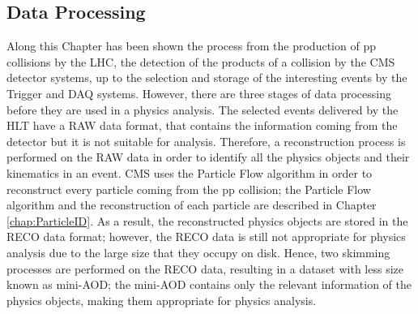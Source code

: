 \subsection{Data Processing}
\noindent Along this Chapter has been shown the process from the production of pp 
collisions by the LHC, the detection of the products of a collision by 
the CMS detector systems, up to the selection and storage of the interesting 
events by the Trigger and DAQ systems. However, there are three stages of data 
processing before they are used in a physics analysis. The selected events delivered 
by the HLT have a RAW data format, that contains the information coming from the 
detector but it is not suitable for analysis. Therefore, a reconstruction process is 
performed on the RAW data in order to identify all the physics objects and their 
kinematics in an event. CMS uses the Particle Flow algorithm in order to reconstruct 
every particle coming from the pp collision; the Particle Flow algorithm and the 
reconstruction of each particle are described in Chapter \ref{chap:ParticleID}. As a result, 
the reconstructed physics objects are stored in the RECO data format; however, the 
RECO data is still not appropriate for physics analysis due to the large size that they 
occupy on disk. Hence, two skimming processes are performed on the RECO data, resulting in 
a dataset with less size known as mini-AOD; the mini-AOD contains only the relevant information 
of the physics objects, making them appropriate for physics analysis.\\












